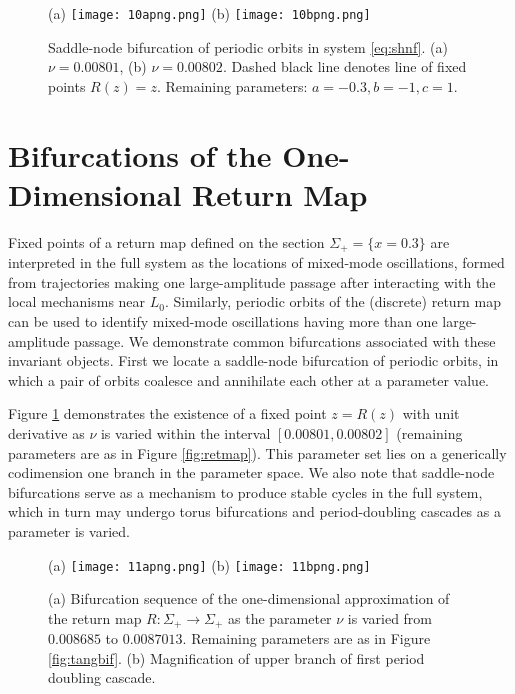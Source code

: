 \documentclass[aip, cha, sd, amsmath,amssymb, preprint]{revtex4-1}
\begin{document}
\begin{figure}
(a) \texttt{[image: 10apng.png]}
(b) \texttt{[image: 10bpng.png]}
\caption{\label{fig:sn} Saddle-node bifurcation of periodic orbits in system \eqref{eq:shnf}. (a) $\nu = 0.00801$, (b) $\nu = 0.00802$.  Dashed black line denotes line of fixed points $R(z) = z$. Remaining parameters: $a = -0.3, b = -1, c = 1$.}
\end{figure}

\section{\label{sec:bif} Bifurcations of the One-Dimensional Return Map}

Fixed points of a return map defined on the section $\Sigma_+ = \{x = 0.3\}$ are interpreted in the full system as the locations of mixed-mode oscillations, formed from trajectories making one large-amplitude passage after interacting with the local mechanisms near $L_0$. Similarly, periodic orbits of the (discrete) return map can be used to identify mixed-mode oscillations having more than one large-amplitude passage. We demonstrate common bifurcations associated with these invariant objects. First we locate a saddle-node bifurcation of periodic orbits, in which a pair of orbits coalesce and annihilate each other at a parameter value. 

Figure \ref{fig:sn} demonstrates the existence of a fixed point $z = R(z)$ with unit derivative as $\nu$ is varied within the interval $\left[0.00801, 0.00802\right]$ (remaining parameters are as in Figure \ref{fig:retmap}). This parameter set lies on a generically codimension one branch in the parameter space. We also note that saddle-node bifurcations serve as a mechanism to produce stable cycles in the full system, which in turn may undergo torus bifurcations and period-doubling cascades as a parameter is varied.

\begin{figure}
(a) \texttt{[image: 11apng.png]}
(b) \texttt{[image: 11bpng.png]}
\caption{\label{fig:bifdiag} (a) Bifurcation sequence of the one-dimensional approximation of the return map $R: \Sigma_+ \to \Sigma_+$ as the parameter $\nu$ is varied from $0.008685$ to $0.0087013$. Remaining parameters are as in Figure \ref{fig:tangbif}. (b) Magnification of upper branch of first period doubling cascade. }
\end{figure}
\end{document}
